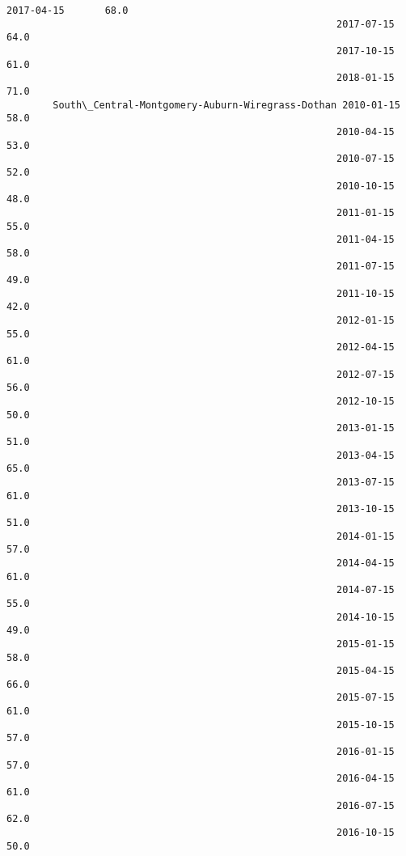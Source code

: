 \documentclass[11pt]{article}
\begin{document}
\begin{Verbatim}[commandchars=\\\{\}]
                                                         2017-04-15       68.0   
                                                         2017-07-15       64.0   
                                                         2017-10-15       61.0   
                                                         2018-01-15       71.0   
        South\_Central-Montgomery-Auburn-Wiregrass-Dothan 2010-01-15       58.0   
                                                         2010-04-15       53.0   
                                                         2010-07-15       52.0   
                                                         2010-10-15       48.0   
                                                         2011-01-15       55.0   
                                                         2011-04-15       58.0   
                                                         2011-07-15       49.0   
                                                         2011-10-15       42.0   
                                                         2012-01-15       55.0   
                                                         2012-04-15       61.0   
                                                         2012-07-15       56.0   
                                                         2012-10-15       50.0   
                                                         2013-01-15       51.0   
                                                         2013-04-15       65.0   
                                                         2013-07-15       61.0   
                                                         2013-10-15       51.0   
                                                         2014-01-15       57.0   
                                                         2014-04-15       61.0   
                                                         2014-07-15       55.0   
                                                         2014-10-15       49.0   
                                                         2015-01-15       58.0   
                                                         2015-04-15       66.0   
                                                         2015-07-15       61.0   
                                                         2015-10-15       57.0   
                                                         2016-01-15       57.0   
                                                         2016-04-15       61.0   
                                                         2016-07-15       62.0   
                                                         2016-10-15       50.0   

\end{Verbatim}
\end{document}
